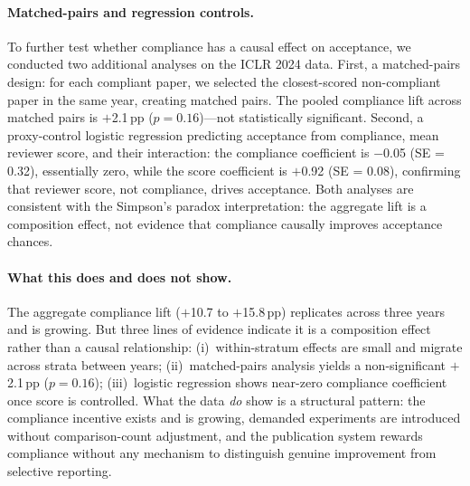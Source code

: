 \documentclass{article}
\begin{document}
\paragraph{Matched-pairs and regression controls.} To further test whether compliance has a causal effect on acceptance, we conducted two additional analyses on the ICLR 2024 data. First, a matched-pairs design: for each compliant paper, we selected the closest-scored non-compliant paper in the same year, creating matched pairs. The pooled compliance lift across matched pairs is $+$2.1\,pp ($p = 0.16$)---not statistically significant. Second, a proxy-control logistic regression predicting acceptance from compliance, mean reviewer score, and their interaction: the compliance coefficient is $-$0.05 (SE = 0.32), essentially zero, while the score coefficient is $+$0.92 (SE = 0.08), confirming that reviewer score, not compliance, drives acceptance. Both analyses are consistent with the Simpson's paradox interpretation: the aggregate lift is a composition effect, not evidence that compliance causally improves acceptance chances.

\paragraph{What this does and does not show.} The aggregate compliance lift ($+$10.7 to $+$15.8\,pp) replicates across three years and is growing. But three lines of evidence indicate it is a composition effect rather than a causal relationship: (i)~within-stratum effects are small and migrate across strata between years; (ii)~matched-pairs analysis yields a non-significant $+$2.1\,pp ($p = 0.16$); (iii)~logistic regression shows near-zero compliance coefficient once score is controlled. What the data \textit{do} show is a structural pattern: the compliance incentive exists and is growing, demanded experiments are introduced without comparison-count adjustment, and the publication system rewards compliance without any mechanism to distinguish genuine improvement from selective reporting.
\end{document}
